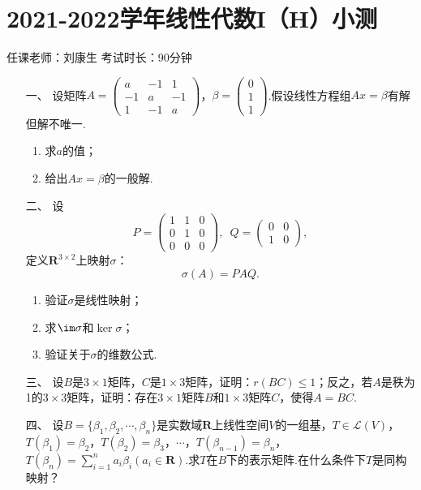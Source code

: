 \section*{2021-2022学年线性代数I（H）小测}

\begin{center}
    任课老师：刘康生\hspace{4em} 考试时长：90分钟
\end{center}
\begin{enumerate}
	\item[一、] 设矩阵$A=\begin{pmatrix}
        a & -1 & 1 \\ -1 & a & -1 \\ 1 & -1 & a
    \end{pmatrix}$，$\beta=\begin{pmatrix}
        0 \\ 1 \\ 1
    \end{pmatrix}$.假设线性方程组$Ax=\beta$有解但解不唯一.
    \begin{enumerate}[label=(\arabic*)]
        \item 求$a$的值；
        \item 给出$Ax=\beta$的一般解.
    \end{enumerate}
	\item[二、]设
	\[P=\begin{pmatrix}
        1 & 1 & 0 \\ 0 & 1 & 0 \\ 0 & 0 & 0
    \end{pmatrix},\enspace Q=\begin{pmatrix}
        0 & 0 \\ 1 & 0
    \end{pmatrix},\]
    定义$\mathbf{R}^{3\times 2}$上映射$\sigma$：
    \[\sigma(A)=PAQ.\]
    \begin{enumerate}[label=(\arabic*)]
        \item 验证$\sigma$是线性映射；
        \item 求$\im\sigma$和$\ker\sigma$；
        \item 验证关于$\sigma$的维数公式.
    \end{enumerate}
	\item[三、]设$B$是$3\times 1$矩阵，$C$是$1\times 3$矩阵，证明：$r(BC)\leqslant 1$；反之，若$A$是秩为1的$3\times 3$矩阵，证明：存在$3\times 1$矩阵$B$和$1\times 3$矩阵$C$，使得$A=BC$.
	\item[四、]设$B=\{\beta_1,\beta_2,\cdots,\beta_n\}$是实数域$\mathbf{R}$上线性空间$V$的一组基，$T\in\mathcal{L}(V)$，$T(\beta_1)=\beta_2$，$T(\beta_2)=\beta_3$，$\cdots$，$T(\beta_{n-1})=\beta_n$，$T(\beta_n)=\sum\limits_{i=1}^{n}a_i\beta_i(a_i\in\mathbf{R})$.求$T$在$B$下的表示矩阵.在什么条件下$T$是同构映射？

\end{enumerate}
